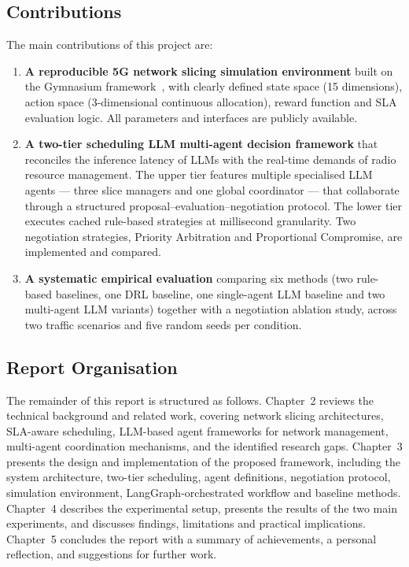 \subsection{Contributions}

The main contributions of this project are:

\begin{enumerate}
    \item \textbf{A reproducible 5G network slicing simulation environment} built on the Gymnasium framework~\cite{brockman2016gym}, with clearly defined state space (15 dimensions), action space (3-dimensional continuous allocation), reward function and SLA evaluation logic. All parameters and interfaces are publicly available.

    \item \textbf{A two-tier scheduling LLM multi-agent decision framework} that reconciles the inference latency of LLMs with the real-time demands of radio resource management. The upper tier features multiple specialised LLM agents --- three slice managers and one global coordinator --- that collaborate through a structured proposal--evaluation--negotiation protocol. The lower tier executes cached rule-based strategies at millisecond granularity. Two negotiation strategies, Priority Arbitration and Proportional Compromise, are implemented and compared.

    \item \textbf{A systematic empirical evaluation} comparing six methods (two rule-based baselines, one DRL baseline, one single-agent LLM baseline and two multi-agent LLM variants) together with a negotiation ablation study, across two traffic scenarios and five random seeds per condition.
\end{enumerate}

\subsection{Report Organisation}

The remainder of this report is structured as follows. Chapter~2 reviews the technical background and related work, covering network slicing architectures, SLA-aware scheduling, LLM-based agent frameworks for network management, multi-agent coordination mechanisms, and the identified research gaps. Chapter~3 presents the design and implementation of the proposed framework, including the system architecture, two-tier scheduling, agent definitions, negotiation protocol, simulation environment, LangGraph-orchestrated workflow and baseline methods. Chapter~4 describes the experimental setup, presents the results of the two main experiments, and discusses findings, limitations and practical implications. Chapter~5 concludes the report with a summary of achievements, a personal reflection, and suggestions for further work.

